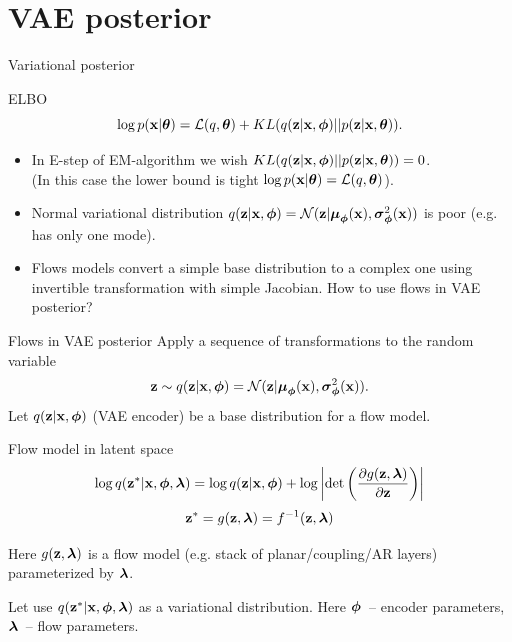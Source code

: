 \section{VAE posterior}
\begin{frame}{Variational posterior}
	\begin{block}{ELBO}
		\[
		\log p(\mathbf{x} | \boldsymbol{\theta}) = \mathcal{L}(q, \boldsymbol{\theta}) + KL(q(\mathbf{z} | \mathbf{x}, \boldsymbol{\phi}) || p(\mathbf{z} | \mathbf{x}, \boldsymbol{\theta})).
		\]
	\end{block}
	\begin{itemize}
		\item In E-step of EM-algorithm we wish $KL(q(\mathbf{z} | \mathbf{x}, \boldsymbol{\phi}) || p(\mathbf{z} | \mathbf{x}, \boldsymbol{\theta})) = 0$. \\
		(In this case the lower bound is tight $\log p(\mathbf{x} | \boldsymbol{\theta}) = \mathcal{L}(q, \boldsymbol{\theta})$). \\
		\item Normal variational distribution $q(\mathbf{z} | \mathbf{x}, \boldsymbol{\phi}) = \mathcal{N}(\mathbf{z}| \boldsymbol{\mu}_{\boldsymbol{\phi}}(\mathbf{x}), \boldsymbol{\sigma}^2_{\boldsymbol{\phi}}(\mathbf{x}))$ is poor (e.g. has only one mode). \\
		\item Flows models convert a simple base distribution to a complex one using invertible transformation with simple Jacobian. How to use flows in VAE posterior?
	\end{itemize}
\end{frame}
\begin{frame}{Flows in VAE posterior}
	Apply a sequence of transformations to the random variable
	\[
	\mathbf{z} \sim q(\mathbf{z} | \mathbf{x}, \boldsymbol{\phi}) = \mathcal{N}(\mathbf{z}| \boldsymbol{\mu}_{\boldsymbol{\phi}}(\mathbf{x}), \boldsymbol{\sigma}^2_{\boldsymbol{\phi}}(\mathbf{x})).
	\]
	Let $q(\mathbf{z} | \mathbf{x}, \boldsymbol{\phi})$ (VAE encoder) be a base distribution for a flow model.
	
	\begin{block}{Flow model in latent space}
		\vspace{-0.3cm}
		\[
			\log q(\mathbf{z}^* | \mathbf{x}, \boldsymbol{\phi}, \boldsymbol{\lambda}) = \log q(\mathbf{z} | \mathbf{x}, \boldsymbol{\phi}) + \log \left | \det \left( \frac{\partial g(\mathbf{z}, \boldsymbol{\lambda})}{\partial \mathbf{z}}\right) \right|
		\]
		\[
			\mathbf{z}^* = g(\mathbf{z}, \boldsymbol{\lambda}) = f^{-1}(\mathbf{z}, \boldsymbol{\lambda})
		\]
	\end{block}
	Here $g(\mathbf{z}, \boldsymbol{\lambda})$ is a flow model (e.g. stack of planar/coupling/AR layers) parameterized by $\boldsymbol{\lambda}$.
	
	
	Let use $q(\mathbf{z}^* | \mathbf{x}, \boldsymbol{\phi}, \boldsymbol{\lambda})$ as a variational distribution. Here $\boldsymbol{\phi}$~-- encoder parameters, $\boldsymbol{\lambda}$~-- flow parameters.
	
\end{frame}
